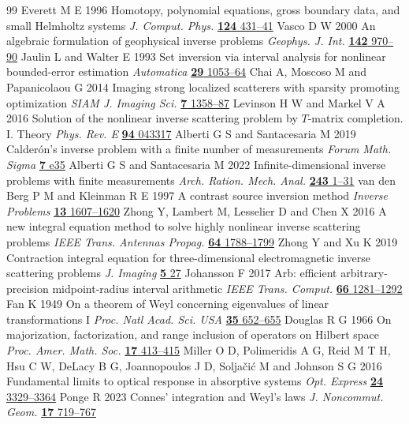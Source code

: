 \begin{thebibliography}{99}
Everett M E 1996 Homotopy, polynomial equations, gross boundary data, and small Helmholtz systems \emph{J. Comput. Phys.} \href{https://doi.org/10.1006/jcph.1996.0070}{\textbf{124} 431--41}
Vasco D W 2000 An algebraic formulation of geophysical inverse problems \emph{Geophys. J. Int.} \href{https://doi.org/10.1046/j.1365-246x.2000.00188.x}{\textbf{142} 970--90}
Jaulin L and Walter E 1993 Set inversion via interval analysis for nonlinear bounded-error estimation \emph{Automatica} \href{https://doi.org/10.1016/0005-1098(93)90106-4}{\textbf{29} 1053--64}
Chai A, Moscoso M and Papanicolaou G 2014 Imaging strong localized scatterers with sparsity promoting optimization \emph{SIAM J. Imaging Sci.} \href{https://doi.org/10.1137/130943200}{\textbf{7} 1358--87}
Levinson H W and Markel V A 2016 Solution of the nonlinear inverse scattering problem by \(T\)-matrix completion. I. Theory \emph{Phys. Rev. E} \href{https://doi.org/10.1103/PhysRevE.94.043317}{\textbf{94} 043317}
Alberti G S and Santacesaria M 2019 Calder\'on's inverse problem with a finite number of measurements \emph{Forum Math. Sigma} \href{https://doi.org/10.1017/fms.2019.31}{\textbf{7} e35}
Alberti G S and Santacesaria M 2022 Infinite-dimensional inverse problems with finite measurements \emph{Arch. Ration. Mech. Anal.} \href{https://doi.org/10.1007/s00205-021-01718-4}{\textbf{243} 1--31}
 van den Berg P M and Kleinman R E 1997 A contrast source inversion method \emph{Inverse Problems} \href{https://doi.org/10.1088/0266-5611/13/6/013}{\textbf{13} 1607--1620}
 Zhong Y, Lambert M, Lesselier D and Chen X 2016 A new integral equation method to solve highly nonlinear inverse scattering problems \emph{IEEE Trans. Antennas Propag.} \href{https://doi.org/10.1109/TAP.2016.2535492}{\textbf{64} 1788--1799}
 Zhong Y and Xu K 2019 Contraction integral equation for three-dimensional electromagnetic inverse scattering problems \emph{J. Imaging} \href{https://doi.org/10.3390/jimaging5020027}{\textbf{5} 27}
 Johansson F 2017 Arb: efficient arbitrary-precision midpoint-radius interval arithmetic \emph{IEEE Trans. Comput.} \href{https://doi.org/10.1109/TC.2017.2690633}{\textbf{66} 1281--1292}
 Fan K 1949 On a theorem of Weyl concerning eigenvalues of linear transformations I \emph{Proc. Natl Acad. Sci. USA} \href{https://doi.org/10.1073/pnas.35.11.652}{\textbf{35} 652--655}
 Douglas R G 1966 On majorization, factorization, and range inclusion of operators on Hilbert space \emph{Proc. Amer. Math. Soc.} \href{https://doi.org/10.1090/S0002-9939-1966-0203464-1}{\textbf{17} 413--415}
 Miller O D, Polimeridis A G, Reid M T H, Hsu C W, DeLacy B G, Joannopoulos J D, Solja\v{c}i\'{c} M and Johnson S G 2016 Fundamental limits to optical response in absorptive systems \emph{Opt. Express} \href{https://doi.org/10.1364/OE.24.003329}{\textbf{24} 3329--3364}
 Ponge R 2023 Connes\textquoteright{} integration and Weyl\textquoteright{}s laws \emph{J. Noncommut. Geom.} \href{https://doi.org/10.4171/JNCG/509}{\textbf{17} 719--767}
\end{thebibliography}
